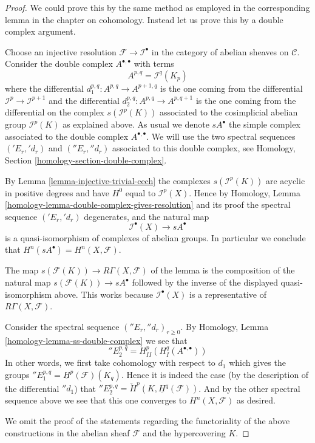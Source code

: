 \begin{proof}
We could prove this by the same method as employed in the corresponding
lemma in the chapter on cohomology. Instead let us prove this by a
double complex argument.

\medskip\noindent
Choose an injective resolution $\mathcal{F} \to \mathcal{I}^\bullet$
in the category of abelian sheaves on $\mathcal{C}$. Consider the
double complex $A^{\bullet, \bullet}$ with terms
$$
A^{p, q} = \mathcal{I}^q(K_p)
$$
where the differential $d_1^{p, q} : A^{p, q} \to A^{p + 1, q}$
is the one coming from the differential $\mathcal{I}^p \to \mathcal{I}^{p + 1}$
and the differential $d_2^{p, q} : A^{p, q} \to A^{p, q + 1}$ is the
one coming from the differential on the complex
$s(\mathcal{I}^p(K))$ associated to the cosimplicial abelian group
$\mathcal{I}^p(K)$ as explained above.
As usual we denote $sA^\bullet$ the simple complex associated to
the double complex $A^{\bullet, \bullet}$.
We will use the two spectral
sequences $({}'E_r, {}'d_r)$ and $({}''E_r, {}''d_r)$
associated to this double complex, see
Homology, Section \ref{homology-section-double-complex}.

\medskip\noindent
By Lemma \ref{lemma-injective-trivial-cech}
the complexes $s(\mathcal{I}^p(K))$ are acyclic in
positive degrees and have $H^0$ equal to $\mathcal{I}^p(X)$.
Hence by
Homology, Lemma \ref{homology-lemma-double-complex-gives-resolution}
and its proof the spectral sequence $({}'E_r, {}'d_r)$ degenerates,
and the natural map
$$
\mathcal{I}^\bullet(X) \longrightarrow sA^\bullet
$$
is a quasi-isomorphism of complexes of abelian groups. In particular
we conclude that $H^n(sA^\bullet) = H^n(X, \mathcal{F})$.

\medskip\noindent
The map $s(\mathcal{F}(K)) \longrightarrow R\Gamma(X, \mathcal{F})$ of
the lemma is the composition of the natural map
$s(\mathcal{F}(K)) \to sA^\bullet$ followed by the inverse
of the displayed quasi-isomorphism above. This works because
$\mathcal{I}^\bullet(X)$ is a representative of $R\Gamma(X, \mathcal{F})$.

\medskip\noindent
Consider the spectral sequence $({}''E_r, {}''d_r)_{r \geq 0}$. By
Homology, Lemma \ref{homology-lemma-ss-double-complex}
we see that
$$
{}''E_2^{p, q} = H^p_{II}(H^q_I(A^{\bullet, \bullet}))
$$
In other words, we first take cohomology with respect to
$d_1$ which gives the groups
${}''E_1^{p, q} = \underline{H}^p(\mathcal{F})(K_q)$.
Hence it is indeed the case (by the description of the differential
${}''d_1$) that
${}''E_2^{p, q} = \check{H}^p(K, \underline{H}^q(\mathcal{F}))$.
And by the other spectral sequence above we see that this one
converges to $H^n(X, \mathcal{F})$ as desired.

\medskip\noindent
We omit the proof of the statements regarding the functoriality of
the above constructions in the abelian sheaf $\mathcal{F}$ and the
hypercovering $K$.
\end{proof}
